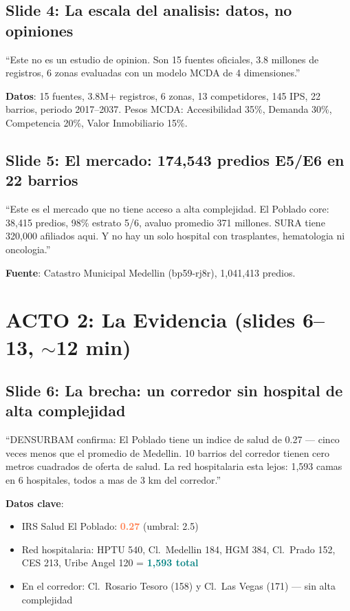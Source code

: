 \documentclass[10pt, a4paper]{article}
\newcommand{\hl}[1]{\textcolor{teal}{\textbf{#1}}}
\newcommand{\dg}[1]{\textcolor{coral}{\textbf{#1}}}
\newcommand{\slide}[2]{\subsection{Slide #1: #2}}
\begin{document}
\slide{4}{La escala del analisis: datos, no opiniones}
\begin{tip}
``Este no es un estudio de opinion. Son 15 fuentes oficiales, 3.8 millones de registros, 6 zonas evaluadas con un modelo MCDA de 4 dimensiones.''
\end{tip}
\textbf{Datos}: 15 fuentes, 3.8M+ registros, 6 zonas, 13 competidores, 145 IPS, 22 barrios, periodo 2017--2037. Pesos MCDA: Accesibilidad 35\%, Demanda 30\%, Competencia 20\%, Valor Inmobiliario 15\%.

\slide{5}{El mercado: 174,543 predios E5/E6 en 22 barrios}
\begin{tip}
``Este es el mercado que no tiene acceso a alta complejidad. El Poblado core: 38,415 predios, 98\% estrato 5/6, avaluo promedio 371 millones. SURA tiene 320,000 afiliados aqui. Y no hay un solo hospital con trasplantes, hematologia ni oncologia.''
\end{tip}
\textbf{Fuente}: Catastro Municipal Medellin (bp59-rj8r), 1,041,413 predios.

\section{ACTO 2: La Evidencia (slides 6--13, $\sim$12 min)}

\slide{6}{La brecha: un corredor sin hospital de alta complejidad}
\begin{tip}
``DENSURBAM confirma: El Poblado tiene un indice de salud de 0.27 --- cinco veces menos que el promedio de Medellin. 10 barrios del corredor tienen cero metros cuadrados de oferta de salud. La red hospitalaria esta lejos: 1,593 camas en 6 hospitales, todos a mas de 3 km del corredor.''
\end{tip}
\textbf{Datos clave}:
\begin{itemize}[nosep]
  \item IRS Salud El Poblado: \dg{0.27} (umbral: 2.5)
  \item Red hospitalaria: HPTU 540, Cl.\ Medellin 184, HGM 384, Cl.\ Prado 152, CES 213, Uribe Angel 120 = \hl{1,593 total}
  \item En el corredor: Cl.\ Rosario Tesoro (158) y Cl.\ Las Vegas (171) --- sin alta complejidad
\end{itemize}
\end{document}
